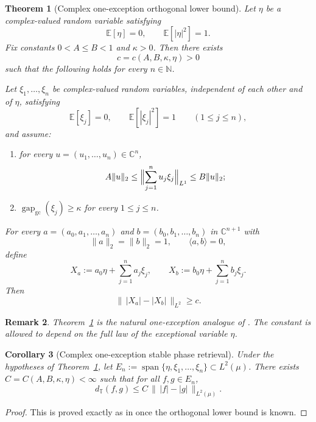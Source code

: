 \documentclass[11pt]{amsart}
\newtheorem{theorem}{Theorem}
\newtheorem{corollary}[theorem]{Corollary}
\newtheorem{remark}[theorem]{Remark}
\newcommand{\E}{\mathbb{E}}
\newcommand{\C}{\mathbb{C}}
\newcommand{\N}{\mathbb{N}}
\newcommand{\gapgc}{\operatorname{gap}_{\mathrm{gc}}}
\newcommand{\dT}{d_{\mathbb{T}}}
\begin{document}
\begin{theorem}[Complex one-exception orthogonal lower bound]
\label{thm:main}
Let $\eta$ be a complex-valued random variable satisfying
\[
  \E[\eta]=0,
  \qquad
  \E[|\eta|^2]=1.
\]
Fix constants $0 < A \le B < 1$ and $\kappa > 0$.  Then there exists
\[
  c = c(A,B,\kappa,\eta) > 0
\]
such that the following holds for every $n \in \N$.

Let $\xi_1,\ldots,\xi_n$ be complex-valued random variables, independent of
each other and of $\eta$, satisfying
\[
  \E[\xi_j]=0,
  \qquad
  \E[|\xi_j|^2]=1
  \qquad (1\le j\le n),
\]
and assume:
\begin{enumerate}[label=\rm(\arabic*)]
\item for every $u=(u_1,\ldots,u_n)\in\C^n$,
\[
  A\|u\|_2
  \le
  \Bigl\|\sum_{j=1}^n u_j\xi_j\Bigr\|_{L^1}
  \le
  B\|u\|_2;
\]
\item $\gapgc(\xi_j)\ge \kappa$ for every $1\le j\le n$.
\end{enumerate}
For every $a=(a_0,a_1,\ldots,a_n)$ and $b=(b_0,b_1,\ldots,b_n)$ in $\C^{n+1}$
with
\[
  \|a\|_2=\|b\|_2=1,
  \qquad
  \langle a,b\rangle=0,
\]
define
\[
  X_a := a_0\eta + \sum_{j=1}^n a_j\xi_j,
  \qquad
  X_b := b_0\eta + \sum_{j=1}^n b_j\xi_j.
\]
Then
\[
  \bigl\|\,|X_a|-|X_b|\,\bigr\|_{L^2} \ge c.
\]
\end{theorem}

\begin{remark}
Theorem~\ref{thm:main} is the natural one-exception analogue of
\cite[Theorem~2.1]{complex_spr}.  The constant is allowed to depend on the full
law of the exceptional variable $\eta$.
\end{remark}

\begin{corollary}[Complex one-exception stable phase retrieval]
\label{cor:spr}
Under the hypotheses of Theorem~\ref{thm:main}, let
$E_n:=\operatorname{span}\{\eta,\xi_1,\ldots,\xi_n\}\subset L^2(\mu)$.  There
exists $C=C(A,B,\kappa,\eta)<\infty$ such that for all $f,g\in E_n$,
\[
  \dT(f,g) \le C\,\bigl\|\,|f|-|g|\,\bigr\|_{L^2(\mu)}.
\]
\end{corollary}

\begin{proof}
This is proved exactly as in \cite[Corollary~2.4]{complex_spr} once the
orthogonal lower bound is known.
\end{proof}
\end{document}
